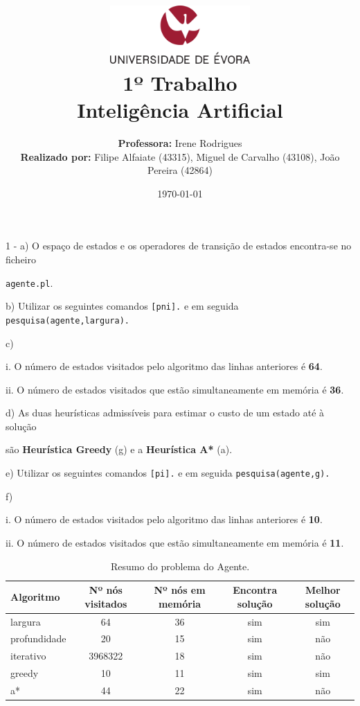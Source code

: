 \documentclass[11pt]{article}
\title
{
    \includegraphics[width=0.4\textwidth]{imgs/university.png}
    \\[0.1cm]
    \textbf{1º Trabalho} \\
    Inteligência Artificial
}
\author
{
    \textbf{Professora:} Irene Rodrigues \\
    \textbf{Realizado por:} Filipe Alfaiate (43315), Miguel de Carvalho (43108), João Pereira (42864) 
}
\date{\today}
\begin{document}
\maketitle

1 - a) O espaço de estados e os operadores de transição de estados encontra-se no ficheiro

\hspace{1,1cm}\verb|agente.pl|.

\hspace{0,6cm}b) Utilizar os seguintes comandos \verb|[pni].| e em seguida 
\verb|pesquisa(agente,largura).|

\hspace{0,6cm}c)

\hspace{1cm}i. O número de estados visitados pelo algoritmo das linhas anteriores é \textbf{64}.

\hspace{1cm}ii. O número de estados visitados que estão simultaneamente em memória é \textbf{36}.

\hspace{0,6cm}d) As duas heurísticas admissíveis para estimar o custo de um estado até à solução

\hspace{1,1cm}são \textbf{Heurística Greedy} (g) e a \textbf{Heurística A*} (a).

\hspace{0,6cm}e) Utilizar os seguintes comandos \verb|[pi].| e em seguida 
\verb|pesquisa(agente,g).|

\hspace{0,6cm}f)

\hspace{1cm}i. O número de estados visitados pelo algoritmo das linhas anteriores é \textbf{10}.

\hspace{1cm}ii. O número de estados visitados que estão simultaneamente em memória é \textbf{11}.


\begin{table}[h!]
    \begin{center}
        \begin{tabular}{l|c|c|c|c}
            \textbf{Algoritmo} & \textbf{Nº nós visitados} & \textbf{Nº nós em memória} & \textbf{Encontra solução} & \textbf{Melhor solução}\\
            \hline
            largura      & 64        & 36 & sim & sim \\
            \hline
            profundidade & 20        & 15 & sim & não \\
            \hline
            iterativo    & 3968322   & 18 & sim & não \\
            \hline
            greedy       & 10        & 11  & sim & sim \\
            \hline
            a*           & 44        & 22 & sim & não
        \end{tabular}
        \caption{Resumo do problema do Agente.}
        \label{tab:table1}
    \end{center}
\end{table}
\end{document}
